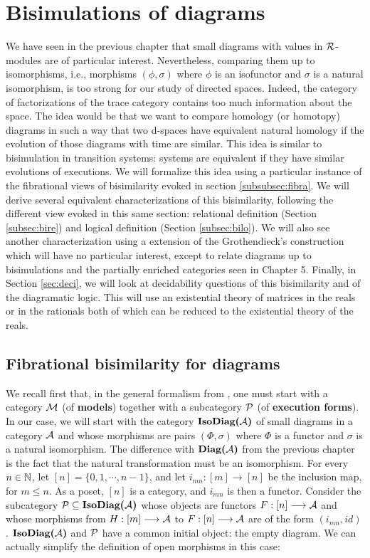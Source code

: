 \chapter{Bisimulations of diagrams}
\label{chap:bisim}


We have seen in the previous chapter that small diagrams with values in $\mathcal{R}$-modules are of particular interest. Nevertheless, comparing them up to isomorphisms, i.e., morphisms $(\phi,\sigma)$ where $\phi$ is an isofunctor and $\sigma$ is a natural isomorphism, is too strong for our study of directed spaces. Indeed, the category of factorizations of the trace category contains too much information about the space. The idea would be that we want to compare homology (or homotopy) diagrams in such a way that two d-spaces have equivalent natural homology if the evolution of those diagrams with time are similar. This idea is similar to bisimulation in transition systems: systems are equivalent if they have similar evolutions of executions. We will formalize this idea using a particular instance of the fibrational views of bisimilarity evoked in section \ref{subsubsec:fibra}. We will derive several equivalent characterizations of this bisimilarity, following the different view evoked in this same section: relational definition (Section \ref{subsec:bire}) and logical definition (Section \ref{subsec:bilo}). We will also see another characterization using a extension of the Grothendieck's construction which will have no particular interest, except to relate diagrams up to bisimulations and the partially enriched categories seen in Chapter 5. Finally, in Section \ref{sec:deci}, we will look at decidability questions of this bisimilarity and of the diagramatic logic. This will use an existential theory of matrices in the reals or in the rationals both of which can be reduced to the existential theory of the reals.


\section{Fibrational bisimilarity for diagrams}

We recall first that, in the general formalism from \cite{joyal96}, one must start with a category $\mathcal{M}$ (of \textbf{models}) together with a subcategory $\mathcal{P}$ (of \textbf{execution forms}). In our case, we will start with the category $\textbf{IsoDiag(}\mathcal{A}\textbf{)}$ of small diagrams in a category $\mathcal{A}$ and whose morphisms are pairs $(\Phi,\sigma)$ where $\Phi$ is a functor and $\sigma$ is a natural isomorphism. The difference with $\textbf{Diag(}\mathcal{A}\textbf{)}$ from the previous chapter is the fact that the natural transformation must be an isomorphism. For every $n \in \mathbb{N}$, let $[n] = \{0, 1, \cdots,
n-1\}$, and let $i_{mn} \colon [m] \to [n]$ be the inclusion map, for $m
\leq n$.  As a poset, $[n]$ is a category, and $i_{mn}$ is then a
functor. Consider the subcategory $\mathcal{P} \subseteq \textbf{IsoDiag(}\mathcal{A}\textbf{)}$ whose objects are functors $F : [n] \longrightarrow \mathcal{A}$ and whose
morphisms from $H : [m] \longrightarrow \mathcal{A}$ to $F : [n] \longrightarrow \mathcal{A}$ are of the
form $(i_{mn}, id)$. $\textbf{IsoDiag(}\mathcal{A}\textbf{)}$ and $\mathcal{P}$ have a common initial object: the empty diagram. We can actually simplify the definition of open morphisms in this case:

